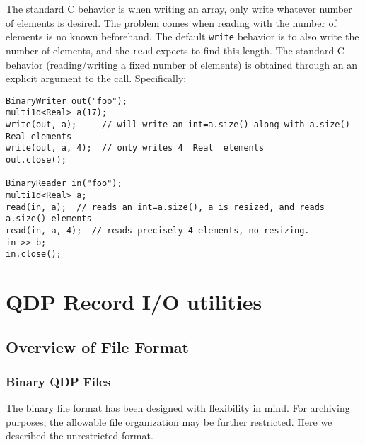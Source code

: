 \documentclass[12pt,letterpaper]{article}
\begin{document}
The standard C behavior is when writing an array, only write whatever
number of elements is desired. The problem comes when reading with the
number of elements is no known beforehand. The default \verb|write| behavior
is to also write the number of elements, and the \verb|read| expects
to find this length. The standard C behavior (reading/writing a fixed
number of elements) is obtained through an an explicit argument to the call.
Specifically:
%
\begin{small}
\begin{verbatim}
BinaryWriter out("foo");
multi1d<Real> a(17);
write(out, a);     // will write an int=a.size() along with a.size() Real elements
write(out, a, 4);  // only writes 4  Real  elements 
out.close();

BinaryReader in("foo");
multi1d<Real> a;
read(in, a);  // reads an int=a.size(), a is resized, and reads a.size() elements
read(in, a, 4);  // reads precisely 4 elements, no resizing.
in >> b;
in.close();
\end{verbatim}
\end{small}



\newpage

\section{QDP Record I/O utilities}
\label{sec:qio}

\subsection{Overview of File Format}
\label{sec.fileformat}

\subsubsection{Binary QDP Files}

The binary file format has been designed with flexibility in mind. For
archiving purposes, the allowable file organization may be further
restricted.  Here we described the unrestricted format.
\end{document}
